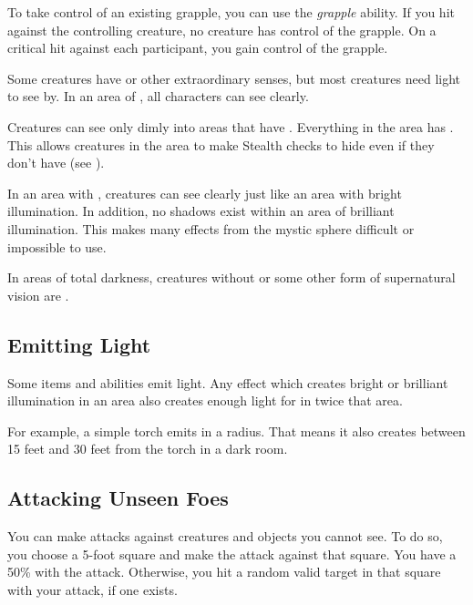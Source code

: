       To take control of an existing grapple, you can use the \textit{grapple} ability.
      If you hit against the controlling creature, no creature has control of the grapple.
      On a critical hit against each participant, you gain control of the grapple.


  Some creatures have  or other extraordinary senses, but most creatures need light to see by.
  In an area of , all characters can see clearly.

  Creatures can see only dimly into areas that have .
  Everything in the area has .
  This allows creatures in the area to make Stealth checks to hide even if they don't have  (see ).

  In an area with , creatures can see clearly just like an area with bright illumination.
  In addition, no shadows exist within an area of brilliant illumination.
  This makes many effects from the  mystic sphere difficult or impossible to use.

  In areas of total darkness, creatures without  or some other form of supernatural vision are \blinded.

  \subsection{Emitting Light}
    Some items and abilities emit light.
    Any effect which creates bright or brilliant illumination in an area also creates enough light for  in twice that area.

    For example, a simple torch emits  in a \smallarea radius.
    That means it also creates  between 15 feet and 30 feet from the torch in a dark room.

  \subsection{Attacking Unseen Foes}
    You can make  attacks against creatures and objects you cannot see.
    To do so, you choose a 5-foot square and make the attack against that square.
    You have a 50\%  with the attack.
    Otherwise, you hit a random valid target in that square with your attack, if one exists.

